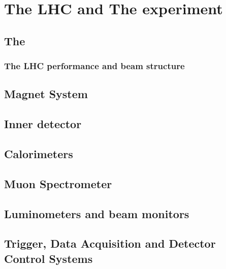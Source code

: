 \chapter{The LHC and The \ATLAS experiment}
\label{chap:MoreStuff}


\section{The \LHC}
\subsection{The LHC performance and beam structure}
\section{Magnet System}
\section{Inner detector}
\section{Calorimeters}
\section{Muon Spectrometer}
\section{Luminometers and beam monitors}
\section{Trigger, Data Acquisition and Detector Control Systems}

